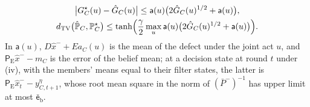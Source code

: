 \begin{theorem}
\begin{enumerate}
\begin{equation}\label{eq:apx-h5a-agency}
\begin{gathered}
\bigl\lvert G^\star_C(u)-\hat G_C(u)\bigr\rvert\le\mathsf a(u)\bigl(2\hat G_C(u)^{1/2}+\mathsf a(u)\bigr),\\
d_{\mathrm{TV}}\bigl(\hat{\mathbb P}_C,\mathbb P^\star_C\bigr)\le\tanh\Bigl(\frac\gamma2\max_u\mathsf a(u)\bigl(2\hat G_C(u)^{1/2}+\mathsf a(u)\bigr)\Bigr) .
\end{gathered}
\end{equation}
In $\mathsf a(u)$, $D\hat x^-+Ea_C(u)$ is the mean of the defect under the joint act $u$, and $\mathsf P_{\mathrm E}\hat x^--m_C$ is the error of the belief mean; at a decision state at round $t$ under (iv), with the members' means equal to their filter states, the latter is $\mathsf P_{\mathrm E}\hat x^-_t-y^\eta_{C,t+1}$, whose root mean square in the norm of $(\bar P^-)^{-1}$ has upper limit at most $\bar{\mathsf e}_{\mathrm b}$.
\end{enumerate}
\end{theorem}

